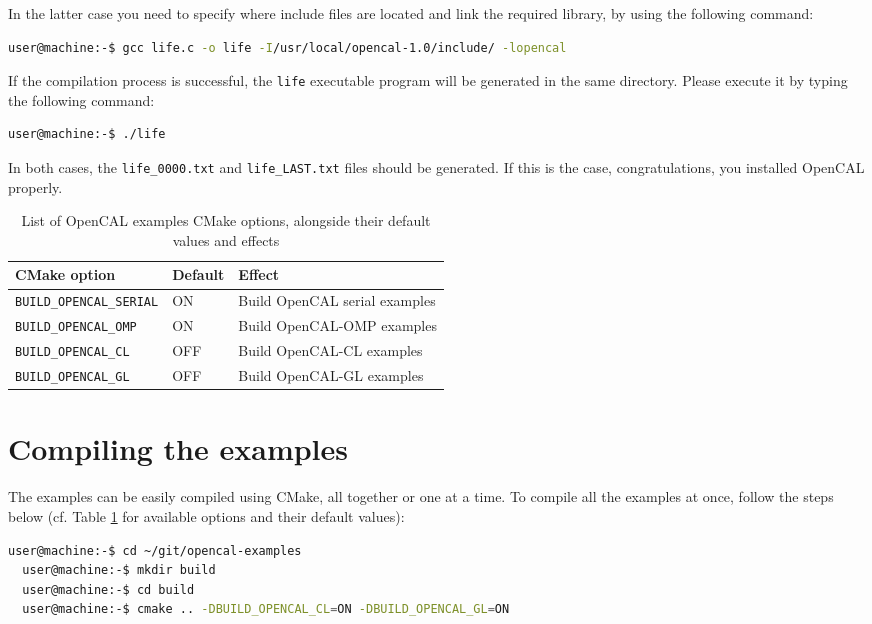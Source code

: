 In the latter case you need to specify where include files are located
and link the required library, by using the following command:
\begin{lstlisting}[numbers=none,language=bash,label={ch:quickstart:gcc-full}]
  user@machine:-$ gcc life.c -o life -I/usr/local/opencal-1.0/include/ -lopencal
\end{lstlisting}

If the compilation process is successful, the \verb'life' executable
program will be generated in the same directory. Please execute it by
typing the following command:
\begin{lstlisting}[numbers=none,language=bash,label={ch:quickstart:gcc}]
  user@machine:-$ ./life
\end{lstlisting}

In both cases, the \verb'life_0000.txt' and \verb'life_LAST.txt' files
should be generated. If this is the case, congratulations, you
installed OpenCAL properly.


\begin{table}[h]
  \centering
  \caption{List of OpenCAL examples CMake options, alongside their default values and
    effects}
  \label{ch:installation:cmakeoptions-example}
  \begin{tabular}{lll}
    \hline
    CMake option &  Default & Effect\\
    \hline
    \verb'BUILD_OPENCAL_SERIAL' & ON  & Build OpenCAL serial examples\\
    \verb'BUILD_OPENCAL_OMP'    & ON  & Build OpenCAL-OMP examples\\
    \verb'BUILD_OPENCAL_CL'     & OFF & Build OpenCAL-CL examples\\
    \verb'BUILD_OPENCAL_GL'     & OFF & Build OpenCAL-GL examples\\
     \hline
  \end{tabular}
\end{table}


\section{Compiling the examples}

The examples can be easily compiled using CMake, all together or one
at a time. To compile all the examples at once, follow the steps below
(cf. Table \ref{ch:installation:cmakeoptions-example} for available
options and their default values):

\begin{lstlisting}[numbers=none,language=bash]
  user@machine:-$ cd ~/git/opencal-examples
  user@machine:-$ mkdir build
  user@machine:-$ cd build
  user@machine:-$ cmake .. -DBUILD_OPENCAL_CL=ON -DBUILD_OPENCAL_GL=ON
\end{lstlisting}

